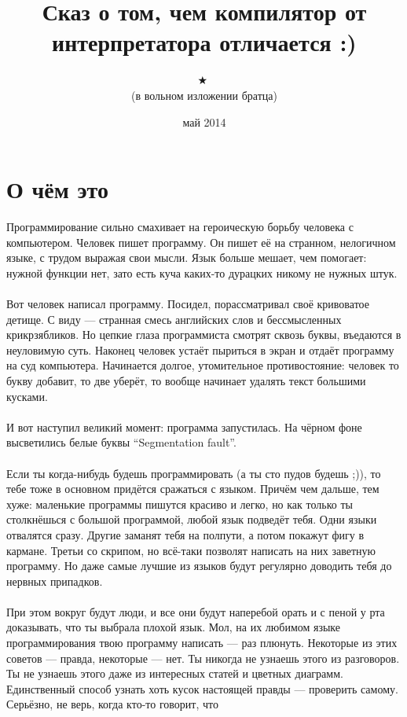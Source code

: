 \documentclass[11pt]{book}
\title{
\small{\textleaf}
\huge{\textleaf}
\huge{\quad}
\large{Сказ о том, чем компилятор от интерпретатора отличается :)}
\huge{\quad}
\huge{\textleaf}
\small{\textleaf}
}
\author{
\small{\textborn} \ 
\small{\APLstar} \ 
\huge{\textborn} \ 
\huge{\APLstar} \ 
\Huge{$\bigstar$} \ 
\huge{\APLstar} \ 
\huge{\textborn} \ 
\small{\APLstar} \ 
\small{\textborn}
\\
\Large (в вольном изложении братца)
\\
\huge{\Bicycle}
}
\date{май 2014}
\begin{document}
\maketitle
\pagebreak

\section*{О чём это}
Программирование сильно смахивает на героическую борьбу человека с компьютером.
Человек пишет программу. Он пишет её на странном, нелогичном языке, с трудом выражая
свои мысли. Язык больше мешает, чем помогает: нужной функции нет, зато есть
куча каких-то дурацких никому не нужных штук.
\\ \\
Вот человек написал программу. Посидел, порассматривал своё кривоватое детище.
С виду --- странная смесь английских слов и бессмысленных крикрзябликов.
Но цепкие глаза программиста смотрят сквозь буквы, въедаются
в неуловимую суть. Наконец человек устаёт пыриться в экран и отдаёт программу
на суд компьютера. Начинается долгое, утомительное противостояние: человек
то букву добавит, то две уберёт, то вообще начинает удалять текст большими кусками.
\\ \\
И вот наступил великий момент: программа запустилась. На чёрном фоне
высветились белые буквы ``Segmentation fault''.
\\ \\
Если ты когда-нибудь будешь программировать (а ты сто пудов будешь ;)), то тебе
тоже в основном придётся сражаться с языком. Причём чем дальше, тем хуже: маленькие
программы пишутся красиво и легко, но как только ты столкнёшься с большой программой,
любой язык подведёт тебя. Одни языки отвалятся сразу. Другие заманят тебя на полпути,
а потом покажут фигу в кармане. Третьи со скрипом, но всё-таки позволят написать на них
заветную программу. Но даже самые лучшие из языков будут регулярно доводить тебя до
нервных припадков.
\\ \\
При этом вокруг будут люди, и все они будут наперебой орать и с пеной у рта
доказывать, что ты выбрала плохой язык. Мол, на их любимом языке программирования
твою программу написать --- раз плюнуть. Некоторые из этих советов --- правда,
некоторые --- нет. Ты никогда не узнаешь этого из разговоров. Ты не узнаешь этого
даже из интересных статей и цветных диаграмм. Единственный способ узнать хоть кусок
настоящей правды --- проверить самому. Серьёзно, не верь, когда кто-то говорит, что
\end{document}
